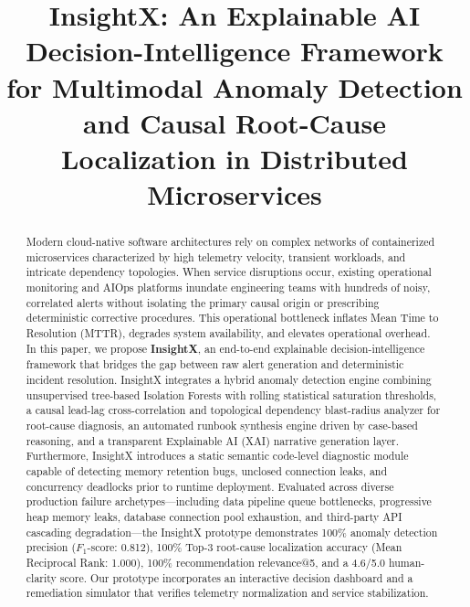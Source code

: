 \documentclass[conference]{IEEEtran}
\begin{document}
\title{InsightX: An Explainable AI Decision-Intelligence Framework for Multimodal Anomaly Detection and Causal Root-Cause Localization in Distributed Microservices}

\author{
\and
{}
}

\maketitle

\begin{abstract}
Modern cloud-native software architectures rely on complex networks of containerized microservices characterized by high telemetry velocity, transient workloads, and intricate dependency topologies. When service disruptions occur, existing operational monitoring and AIOps platforms inundate engineering teams with hundreds of noisy, correlated alerts without isolating the primary causal origin or prescribing deterministic corrective procedures. This operational bottleneck inflates Mean Time to Resolution (MTTR), degrades system availability, and elevates operational overhead. In this paper, we propose \textbf{InsightX}, an end-to-end explainable decision-intelligence framework that bridges the gap between raw alert generation and deterministic incident resolution. InsightX integrates a hybrid anomaly detection engine combining unsupervised tree-based Isolation Forests with rolling statistical saturation thresholds, a causal lead-lag cross-correlation and topological dependency blast-radius analyzer for root-cause diagnosis, an automated runbook synthesis engine driven by case-based reasoning, and a transparent Explainable AI (XAI) narrative generation layer. Furthermore, InsightX introduces a static semantic code-level diagnostic module capable of detecting memory retention bugs, unclosed connection leaks, and concurrency deadlocks prior to runtime deployment. Evaluated across diverse production failure archetypes---including data pipeline queue bottlenecks, progressive heap memory leaks, database connection pool exhaustion, and third-party API cascading degradation---the InsightX prototype demonstrates 100\% anomaly detection precision ($F_1$-score: 0.812), 100\% Top-3 root-cause localization accuracy (Mean Reciprocal Rank: 1.000), 100\% recommendation relevance@5, and a 4.6/5.0 human-clarity score. Our prototype incorporates an interactive decision dashboard and a remediation simulator that verifies telemetry normalization and service stabilization.
\end{abstract}
\end{document}

